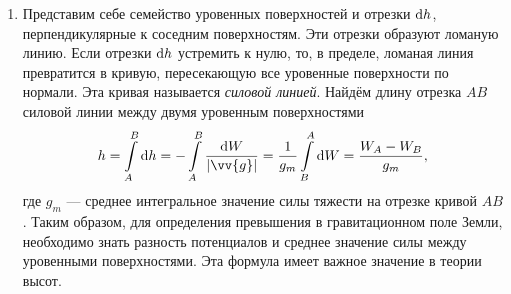 \documentclass[11pt, a4paper]{article}
\theoremstyle{plain}
\theoremstyle{definition}
\theoremstyle{remark}
\begin{document}
\begin{enumerate}
	\item Представим себе семейство уровенных поверхностей и отрезки $\dif h$, перпендикулярные к соседним поверхностям. Эти отрезки образуют ломаную линию. Если отрезки $\dif h$ устремить к нулю, то, в пределе, ломаная линия превратится в кривую, пересекающую все уровенные поверхности по нормали. Эта кривая называется \textit{силовой линией}. Найдём длину отрезка $AB$ силовой линии между двумя уровенным
        поверхностями
        \begin{equation*}
            h = \int\limits_{A}^{B}\dif h =  -\int\limits_{A}^{B} \dfrac{\dif W}{|\vv{g}|} = \dfrac{1}{g_m}\int\limits_{B}^{A} \dif W = \dfrac{W_A - W_B}{g_m},
        \end{equation*}
        где $g_m$ --- среднее интегральное значение силы тяжести на отрезке кривой $AB$. Таким образом, для определения превышения в гравитационном поле Земли, необходимо знать разность потенциалов  и среднее значение силы между уровенными поверхностями. Эта формула имеет важное значение в теории высот.
\end{enumerate}

\end{document}
